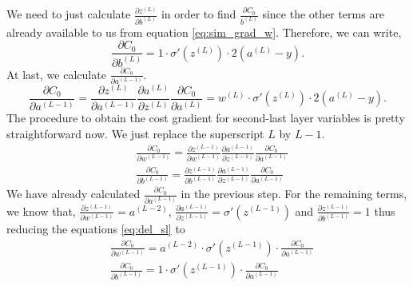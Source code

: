 We need to just calculate $\frac{\partial z^{(L)}}{\partial b^{(L)}}$ in order to find $\frac{\partial C_0}{b^{(L)}}$ since the other terms are already available to us from equation \eqref{eq:sim_grad_w}. Therefore, we can write, 
\begin{equation}
    \label{del_b}
    \frac{\partial C_0}{\partial b^{(L)}} = 1 \cdot \sigma'(z^{(L)}) \cdot 2(a^{(L)} -y).
\end{equation}
At last, we calculate $\frac{\partial C_0}{\partial a^{(L-1)}}$. 
\begin{equation}
    \label{eq:del_a}
    \frac{\partial C_0}{\partial a^{(L-1)}} = \frac{\partial z^{(L)}}{\partial a^{(L-1)}} \frac{\partial a^{(L)}}{\partial z^{(L)}} \frac{\partial C_0}{\partial a^{(L)}} = w^{(L)}\cdot\sigma'(z^{(L)}) \cdot 2(a^{(L)} -y).
\end{equation}
The procedure to obtain the cost gradient for second-last layer variables is pretty straightforward now. We just replace the superscript $L$ by $L-1$. 
\begin{equation}
    \label{eq:del_sl}
    \begin{aligned}
        &\frac{\partial C_0}{\partial w^{(L-1)}} = \frac{\partial z^{(L-1)}}{\partial w^{(L-1)}} \frac{\partial a^{(L-1)}}{\partial z^{(L-1)}} \frac{\partial C_0}{\partial a^{(L-1)}}\\
        &\frac{\partial C_0}{\partial b^{(L-1)}} = \frac{\partial z^{(L-1)}}{\partial b^{(L-1)}} \frac{\partial a^{(L-1)}}{\partial z^{(L-1)}} \frac{\partial C_0}{\partial a^{(L-1)}}
    \end{aligned}
\end{equation}
We have already calculated $\frac{\partial C_0}{\partial a^{(L-1)}}$ in the previous step. For the remaining terms, we know that,
 $\frac{\partial z^{(L-1)}}{\partial w^{(L-1)}} = a^{(L-2)}$, $\frac{\partial a^{(L-1)}}{\partial z^{(L-1)}} = \sigma'(z^{(L-1)})$ and  $\frac{\partial z^{(L-1)}}{\partial b^{(L-1)}} = 1$
 thus reducing the equations \eqref{eq:del_sl} to
 \begin{equation}
    \label{eq:del_sl_f}
    \begin{aligned}
        &\frac{\partial C_0}{\partial w^{(L-1)}} =  a^{(L-2)} \cdot \sigma'(z^{(L-1)}) \cdot \frac{\partial C_0}{\partial a^{(L-1)}}\\
        &\frac{\partial C_0}{\partial b^{(L-1)}} = 1 \cdot \sigma'(z^{(L-1)}) \cdot \frac{\partial C_0}{\partial a^{(L-1)}}
    \end{aligned}
\end{equation}

